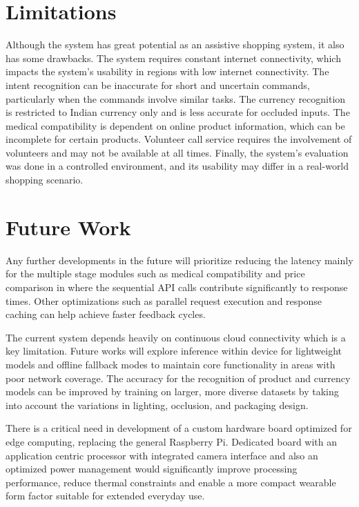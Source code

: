 \documentclass[conference]{IEEEtran}
\begin{document}
\section{Limitations}

Although the system has great potential as an assistive shopping system, it also has some drawbacks. The system requires constant internet connectivity, which impacts the system’s usability in regions with low internet connectivity. The intent recognition can be inaccurate for short and uncertain commands, particularly when the commands involve similar tasks. The currency recognition is restricted to Indian currency only and is less accurate for occluded inputs. The medical compatibility is dependent on online product information, which can be incomplete for certain products. Volunteer call service requires the involvement of volunteers and may not be available at all times. Finally, the system’s evaluation was done in a controlled environment, and its usability may differ in a real-world shopping scenario.

\section{Future Work}
Any further developments in the future will prioritize reducing the latency mainly for the multiple stage modules such as medical compatibility and price comparison in where the sequential API calls contribute significantly to response times. Other optimizations such as parallel request execution and response caching can help achieve faster feedback cycles.

The current system depends heavily on continuous cloud connectivity which is a key limitation. Future works will explore inference within device for lightweight models and offline fallback modes to maintain core functionality in areas with poor network coverage. The accuracy for the recognition of product and currency models can be improved by training on larger, more diverse datasets by taking into account the variations in lighting, occlusion, and packaging design.

There is a critical need in development of a custom hardware board optimized for edge computing, replacing the general Raspberry Pi. Dedicated board with an application centric processor with integrated camera interface and also an optimized power management would significantly improve processing performance, reduce thermal constraints and enable a more compact wearable form factor suitable for extended everyday use.
\end{document}
